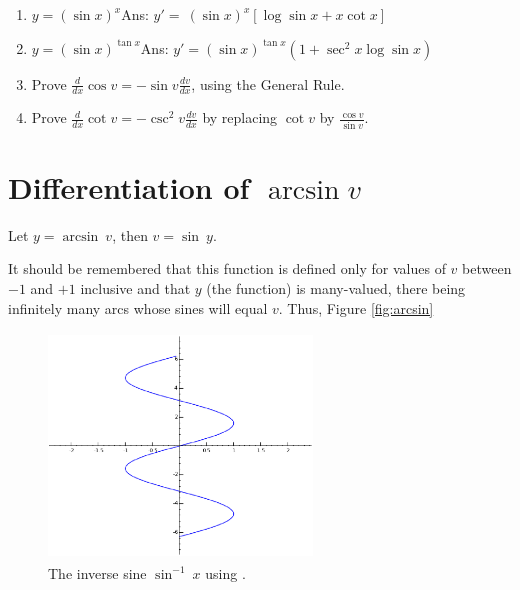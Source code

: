 \begin{enumerate}
\item
$y = (\sin x)^x$\qquad\qquad\qquad\qquad\qquad\qquad Ans:  	
$y' 	=\ (\sin x)^x [ \log \sin x + x \cot x]$

\item
$y = (\sin x)^{\tan x}$\qquad\qquad\qquad\qquad Ans:  	
$y' = (\sin x)^{\tan x} (1 + \sec^2 x \log \sin x)$

\item
Prove $\frac{d}{dx} \cos v = -\sin v \frac{dv}{dx}$, using the General Rule.

\item
Prove $\frac{d}{dx} \cot v = -\csc^2 v \frac{dv}{dx}$ by replacing $\cot v$ by 
$\frac{\cos v}{\sin v}$.

\end{enumerate}

\section{Differentiation of $\arcsin v$}

Let $y 	= \arcsin\ v$, then $v 	= \sin\ y$.

It should be remembered that this function is defined only for values of 
$v$ between $-1$ and $+1$ inclusive and that $y$ (the function) is many-valued,
there being infinitely many arcs whose sines will equal $v$. Thus, Figure 
\ref{fig:arcsin}

\begin{figure}[h!]
\begin{minipage}{\textwidth}
\begin{center}
\includegraphics[height=6cm,width=7cm]{arcsin2.eps}
\end{center}
\end{minipage}
\caption{The inverse sine $\sin^{-1}\ x$ using \sage.}
\label{fig:arcsin2}
\end{figure}


